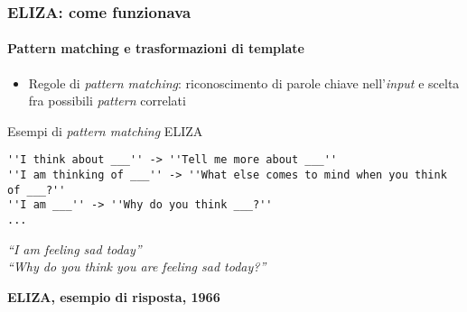 %
\begin{frame}[t,fragile] \frametitle{ELIZA: come funzionava}
	{\small
		\onslide<1->
		\framesubtitle{Pattern matching e trasformazioni di template}
		\begin{itemize}[leftmargin=10pt,align=right]
			\item[\alert{\faArrowCircleRight}] \alert{Regole di \textit{pattern matching}:} riconoscimento di parole chiave nell'\textit{input} e scelta fra possibili \textit{pattern} correlati
		\end{itemize}
		\vspace*{.3cm}
		\begin{shellcodeblock}{Esempi di \textit{pattern matching} ELIZA}
        	\begin{verbatim}
''I think about ___'' -> ''Tell me more about ___''
''I am thinking of ___'' -> ''What else comes to mind when you think of ___?''
''I am ___'' -> ''Why do you think ___?''
...
        	\end{verbatim}
    	\end{shellcodeblock}
		\hspace*{4cm}
		\begin{minipage}[t]{.6\textwidth}
			\renewcommand{\epigraphsize}{\scriptsize}
			\setlength{\afterepigraphskip}{0pt}
			\setlength{\beforeepigraphskip}{5pt}
			\setlength{\epigraphwidth}{0.9\textwidth}
			\epigraph{\textit{\alert{\faUser} ``\alert{I am} feeling sad today''\\
			\alert{\faTerminal} ``Why do you think you are feeling sad today?''}}{\textbf{ELIZA, esempio di risposta, 1966}}
		\end{minipage}
	}
\end{frame}
%
